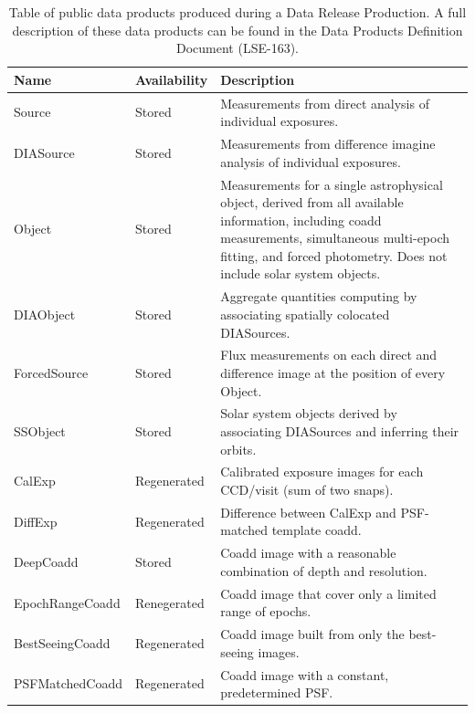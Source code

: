 \begin{table}
\small
\begin{tabularx}{\textwidth}{ | l | l | X | }
  \hline
  {\bf Name} & {\bf Availability} & {\bf Description} \\
  \hline
  Source & Stored &
  Measurements from direct analysis of individual exposures. \\
  \hline
  DIASource & Stored &
  Measurements from difference imagine analysis of individual exposures. \\
  \hline
  Object & Stored &
  Measurements for a single astrophysical object, derived from all available information, including coadd measurements, simultaneous multi-epoch fitting, and forced photometry.  Does not include solar system objects. \\
  \hline
  DIAObject& Stored &
  Aggregate quantities computing by associating spatially colocated DIASources. \\
  \hline
  ForcedSource & Stored &
  Flux measurements on each direct and difference image at the position of every Object. \\
  \hline
  SSObject & Stored &
  Solar system objects derived by associating DIASources and inferring their orbits. \\
  \hline
  CalExp & Regenerated &
  Calibrated exposure images for each CCD/visit (sum of two snaps). \\
  \hline
  DiffExp & Regenerated &
  Difference between CalExp and PSF-matched template coadd. \\
  \hline
  DeepCoadd & Stored &
  Coadd image with a reasonable combination of depth and resolution. \\
  \hline
  EpochRangeCoadd & Renegerated &
  Coadd image that cover only a limited range of epochs. \\
  \hline
  BestSeeingCoadd & Regenerated &
  Coadd image built from only the best-seeing images. \\
  \hline
  PSFMatchedCoadd & Regenerated &
  Coadd image with a constant, predetermined PSF. \\
  \hline
\end{tabularx}
\caption{Table of public data products produced during a Data Release Production.  A full description of these data products can be found in the Data Products Definition Document (LSE-163).
\label{table:drp_data_products}}
\end{table}

